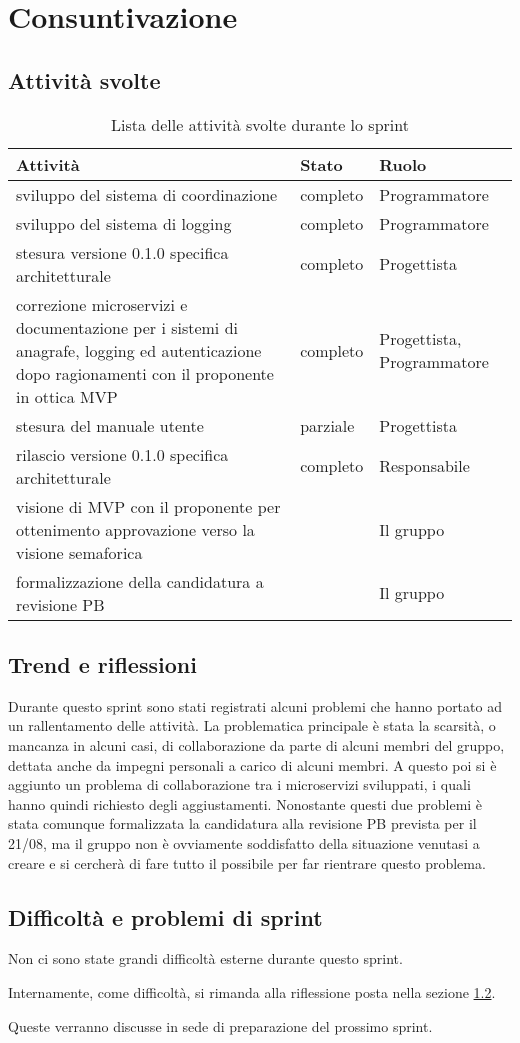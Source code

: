 \section{Consuntivazione}

\subsection{Attività svolte}

\begin{table}[H]
    \begin{xltabular}{\textwidth}{X l l}

         \textbf{Attività} & \textbf{Stato} & \textbf{Ruolo}\\
        \endhead
        \hline
        sviluppo del sistema di coordinazione & completo & Programmatore \\
        sviluppo del sistema di logging & completo & Programmatore \\
        stesura versione 0.1.0 specifica architetturale & completo & Progettista\\
        correzione microservizi e documentazione per i sistemi di anagrafe, logging ed autenticazione dopo ragionamenti con il proponente in ottica MVP & completo & Progettista, Programmatore \\
        stesura del manuale utente & parziale & Progettista \\
        rilascio versione 0.1.0 specifica architetturale & completo & Responsabile \\
        visione di MVP con il proponente per ottenimento approvazione verso la visione semaforica & & Il gruppo \\
        formalizzazione della candidatura a revisione PB & & Il gruppo \\
    \end{xltabular}
    \caption{Lista delle attività svolte durante lo sprint}
\end{table}

\subsection{Trend e riflessioni}\label{subsec:trend}

Durante questo sprint sono stati registrati alcuni problemi che hanno portato ad un rallentamento delle attività. La problematica principale è stata la scarsità, o mancanza in alcuni casi, di collaborazione da parte di alcuni membri del gruppo, dettata anche da impegni personali a carico di alcuni membri. A questo poi si è aggiunto un problema di collaborazione tra i microservizi sviluppati, i quali hanno quindi richiesto degli aggiustamenti. Nonostante questi due problemi è stata comunque formalizzata la candidatura alla revisione PB prevista per il 21/08, ma il gruppo non è ovviamente soddisfatto della situazione venutasi a creare e si cercherà di fare tutto il possibile per far rientrare questo problema.

\subsection{Difficoltà e problemi di sprint}

Non ci sono state grandi difficoltà esterne durante questo sprint.

Internamente, come difficoltà, si rimanda alla riflessione posta nella sezione \ref{subsec:trend}.

Queste verranno discusse in sede di preparazione del prossimo sprint.